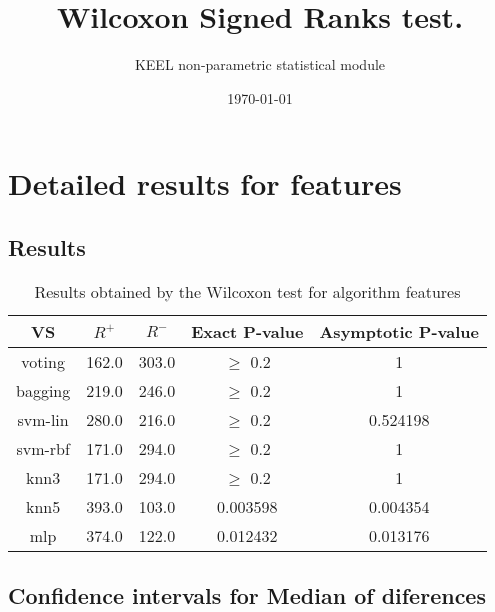 \documentclass[a4paper,10pt]{article}
\title{Wilcoxon Signed Ranks test.}
\date{\today}
\author{KEEL non-parametric statistical module}
\begin{document}
\pagestyle{empty}
\maketitle
\thispagestyle{empty}



\section{Detailed results for features}


\subsection{Results}

\begin{table}[!htp]
\centering\small
\begin{tabular}{
|c|c|c|c|c|}
\hline
 VS & $R^{+}$ & $R^{-}$ & Exact P-value & Asymptotic P-value \\ \hline 
voting & 162.0 & 303.0 & $\geq$ 0.2 & 1\\ \hline 
bagging & 219.0 & 246.0 & $\geq$ 0.2 & 1\\ \hline 
svm-lin & 280.0 & 216.0 & $\geq$ 0.2 & 0.524198\\ \hline 
svm-rbf & 171.0 & 294.0 & $\geq$ 0.2 & 1\\ \hline 
knn3 & 171.0 & 294.0 & $\geq$ 0.2 & 1\\ \hline 
knn5 & 393.0 & 103.0 & 0.003598 & 0.004354\\ \hline 
mlp & 374.0 & 122.0 & 0.012432 & 0.013176\\ \hline 

\end{tabular}
\caption{Results obtained by the Wilcoxon test for algorithm features}
\end{table}

\subsection{Confidence intervals for Median of diferences}
\end{document}
